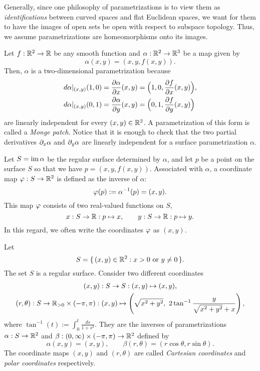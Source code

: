 \documentclass{../../large}
\def\a{\alpha}
\begin{document}
\begin{ex}
\begin{parts}
Generally, since one philosophy of parametrizations is to view them as \emph{identifications} between curved spaces and flat Euclidean spaces, we want for them to have the images of open sets be open with respect to subspace topology.
Thus, we assume parametrizations are homeomorphisms onto its images.

\item
Let $f:\mathbb{R}^2\to\mathbb{R}$ be any smooth function and $\a:\R^2\to\R^3$ be a map given by
\[\a(x,y)=(x,y,f(x,y)).\]
Then, $\a$ is a two-dimensional parametrization because
\begin{align*}
d\a|_{(x,y)}(1,0)&=\pd{\a}{x}(x,y)=\Bigl(1,0,\pd{f}{x}(x,y)\Bigr),\\
d\a|_{(x,y)}(0,1)&=\pd{\a}{y}(x,y)=\Bigl(0,1,\pd{f}{y}(x,y)\Bigr)
\end{align*}
are linearly independent for every $(x,y)\in\mathbb{R}^2$.
A parametrization of this form is called a \emph{Monge patch}.
Notice that it is enough to check that the two partial derivatives $\pd_x\a$ and $\pd_y\a$ are linearly independent for a surface parametrization $\a$.

Let $S=\im\a$ be the regular surface determined by $\a$, and let $p$ be a point on the surface $S$ so that we have $p=(x,y,f(x,y))$.
Associated with $\a$, a coordinate map $\varphi:S\to\mathbb{R}^2$ is defined as the inverse of $\a$:
\[\f(p):=\a^{-1}(p)=(x,y).\]
This map $\varphi$ consists of two real-valued functions on $S$,
\[x:S\to\mathbb{R}:p\mapsto x,\qquad y:S\to\mathbb{R}:p\mapsto y.\]
In this regard, we often write the coordinates $\varphi$ as $(x,y)$.

\item
Let
\[S=\{\,(x,y)\in\mathbb{R}^2:x>0\text{ or }y\ne0\,\}.\]
The set $S$ is a regular surface.
Consider two different coordinates
\begin{gather*}
(x,y):S\to S:(x,y)\mapsto(x,y),\\
(r,\theta):S\to\R_{>0}\times(-\pi,\pi):(x,y)\mapsto\left(\sqrt{x^2+y^2},\ 2\tan^{-1}\frac y{\sqrt{x^2+y^2}+x}\right),
\end{gather*}
where $\tan^{-1}(t):=\int_0^t\frac{ds}{1+s^2}$.
They are the inverses of parametrizations $\a:S\to\R^2$ and $\beta:(0,\infty)\times(-\pi,\pi)\to\mathbb{R}^2$ defined by
\[\a(x,y)=(x,y),\qquad\beta(r,\theta)=(r\cos\theta,r\sin\theta).\]
The coordinate maps $(x,y)$ and $(r,\theta)$ are called \emph{Cartesian coordinates} and \emph{polar coordinates} respectively.
\end{parts}
\end{ex}
\end{document}
